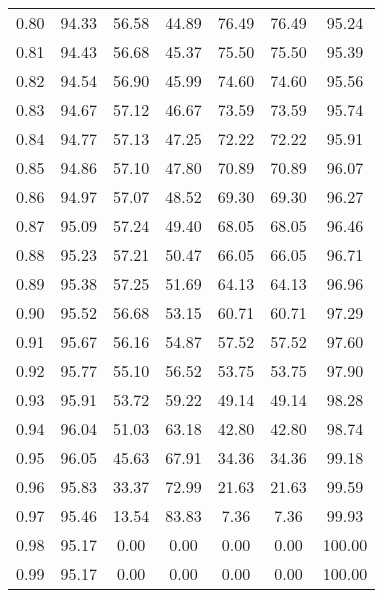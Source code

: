 \begin{tabular}{|c|c|c|c|c|c|c|}
      0.80 &     94.33 &     56.58 &      44.89 &   76.49 &      76.49 &         95.24 \\
      0.81 &     94.43 &     56.68 &      45.37 &   75.50 &      75.50 &         95.39 \\
      0.82 &     94.54 &     56.90 &      45.99 &   74.60 &      74.60 &         95.56 \\
      0.83 &     94.67 &     57.12 &      46.67 &   73.59 &      73.59 &         95.74 \\
      0.84 &     94.77 &     57.13 &      47.25 &   72.22 &      72.22 &         95.91 \\
      0.85 &     94.86 &     57.10 &      47.80 &   70.89 &      70.89 &         96.07 \\
      0.86 &     94.97 &     57.07 &      48.52 &   69.30 &      69.30 &         96.27 \\
      0.87 &     95.09 &     57.24 &      49.40 &   68.05 &      68.05 &         96.46 \\
      0.88 &     95.23 &     57.21 &      50.47 &   66.05 &      66.05 &         96.71 \\
      0.89 &     95.38 &     57.25 &      51.69 &   64.13 &      64.13 &         96.96 \\
      0.90 &     95.52 &     56.68 &      53.15 &   60.71 &      60.71 &         97.29 \\
      0.91 &     95.67 &     56.16 &      54.87 &   57.52 &      57.52 &         97.60 \\
      0.92 &     95.77 &     55.10 &      56.52 &   53.75 &      53.75 &         97.90 \\
      0.93 &     95.91 &     53.72 &      59.22 &   49.14 &      49.14 &         98.28 \\
      0.94 &     96.04 &     51.03 &      63.18 &   42.80 &      42.80 &         98.74 \\
      0.95 &     96.05 &     45.63 &      67.91 &   34.36 &      34.36 &         99.18 \\
      0.96 &     95.83 &     33.37 &      72.99 &   21.63 &      21.63 &         99.59 \\
      0.97 &     95.46 &     13.54 &      83.83 &    7.36 &       7.36 &         99.93 \\
      0.98 &     95.17 &      0.00 &       0.00 &    0.00 &       0.00 &        100.00 \\
      0.99 &     95.17 &      0.00 &       0.00 &    0.00 &       0.00 &        100.00 \\
\bottomrule
\end{tabular}
